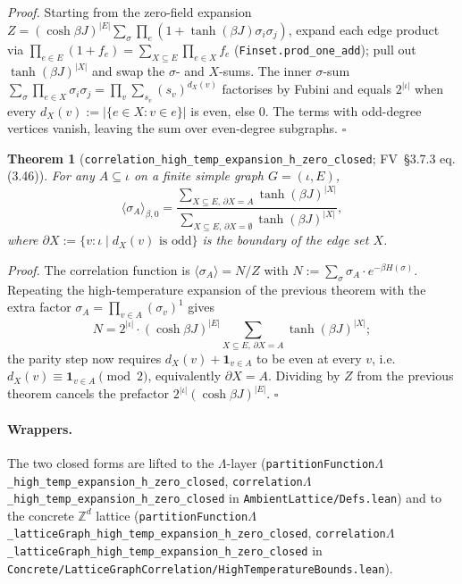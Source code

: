 \documentclass[a4paper,11pt]{article}
\newtheorem{theorem}{Theorem}
\newcommand{\LeanLambda}{\texorpdfstring{\ensuremath{\Lambda}}{Lambda}}
\begin{document}
\textit{Proof.} Starting from the zero-field expansion
$Z = (\cosh \beta J)^{|E|} \sum_\sigma \prod_e (1 + \tanh(\beta J)\sigma_i\sigma_j)$,
expand each edge product via
$\prod_{e \in E}(1 + f_e) = \sum_{X \subseteq E} \prod_{e \in X} f_e$
(\texttt{Finset.prod\_one\_add}); pull out $\tanh(\beta J)^{|X|}$ and
swap the $\sigma$- and $X$-sums. The inner $\sigma$-sum
$\sum_\sigma \prod_{e \in X} \sigma_i\sigma_j = \prod_v \sum_{s_v}(s_v)^{d_X(v)}$
factorises by Fubini and equals $2^{|\iota|}$ when every
$d_X(v) := |\{e \in X : v \in e\}|$ is even, else $0$. The terms with
odd-degree vertices vanish, leaving the sum over even-degree
subgraphs.
\hfill$\square$

\begin{theorem}[\texttt{correlation\_high\_temp\_expansion\_h\_zero\_closed}; FV~\S3.7.3 eq.\,(3.46)]
For any $A \subseteq \iota$ on a finite simple graph $G = (\iota, E)$,
\[
\langle \sigma_A \rangle_{\beta, 0} =
  \frac{\sum_{X \subseteq E,\, \partial X = A} \tanh(\beta J)^{|X|}}
       {\sum_{X \subseteq E,\, \partial X = \emptyset} \tanh(\beta J)^{|X|}},
\]
where $\partial X := \{ v : \iota \mid d_X(v) \text{ is odd}\}$ is the
boundary of the edge set $X$.
\end{theorem}

\textit{Proof.} The correlation function is
$\langle \sigma_A \rangle = N / Z$ with
$N := \sum_\sigma \sigma_A \cdot e^{-\beta H(\sigma)}$. Repeating the
high-temperature expansion of the previous theorem with the extra
factor $\sigma_A = \prod_{v \in A} (\sigma_v)^{1}$ gives
\[
N = 2^{|\iota|} \cdot (\cosh \beta J)^{|E|}
   \sum_{X \subseteq E,\, \partial X = A} \tanh(\beta J)^{|X|};
\]
the parity step now requires
$d_X(v) + \mathbf{1}_{v \in A}$ to be even at every $v$, i.e.\
$d_X(v) \equiv \mathbf{1}_{v \in A} \pmod{2}$, equivalently
$\partial X = A$. Dividing by $Z$ from the previous theorem
cancels the prefactor $2^{|\iota|} (\cosh \beta J)^{|E|}$.
\hfill$\square$

\paragraph{Wrappers.} The two closed forms are lifted to the
\(\Lambda\)-layer (\texttt{partitionFunction\LeanLambda\_high\_temp\_expansion\_h\_zero\_closed},
\texttt{correlation\LeanLambda\_high\_temp\_expansion\_h\_zero\_closed} in
\texttt{AmbientLattice/Defs.lean}) and to the concrete
\(\mathbb{Z}^d\) lattice
(\texttt{partitionFunction\LeanLambda\_latticeGraph\_high\_temp\_expansion\_h\_zero\_closed},
\texttt{correlation\LeanLambda\_latticeGraph\_high\_temp\_expansion\_h\_zero\_closed}
in \texttt{Concrete/LatticeGraphCorrelation/HighTemperatureBounds.lean}).
\end{document}
